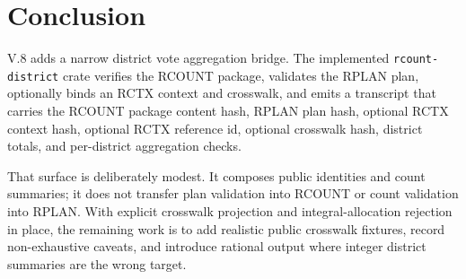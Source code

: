 \section{Conclusion}

V.8 adds a narrow district vote aggregation bridge. The implemented
\texttt{rcount-district} crate verifies the RCOUNT package, validates the RPLAN
plan, optionally binds an RCTX context and crosswalk, and emits a transcript
that carries the RCOUNT package content hash, RPLAN plan hash, optional RCTX
context hash, optional RCTX reference id, optional crosswalk hash, district
totals, and per-district aggregation checks.

That surface is deliberately modest. It composes public identities and count
summaries; it does not transfer plan validation into RCOUNT or count validation
into RPLAN. With explicit crosswalk projection and integral-allocation rejection
in place, the remaining work is to add realistic public crosswalk fixtures,
record non-exhaustive caveats, and introduce rational output where integer
district summaries are the wrong target.
